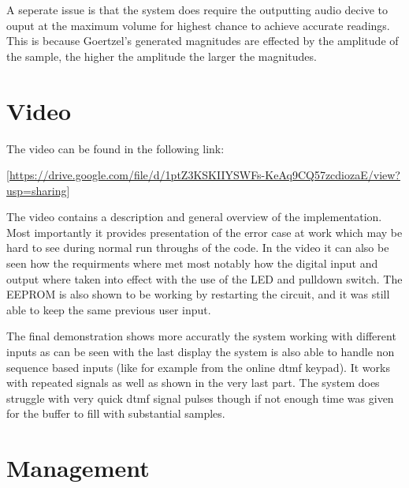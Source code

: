 \documentclass{cce2014-design}
\begin{document}
A seperate issue is that the system does require the outputting audio decive to 
ouput at the maximum volume for highest chance to achieve accurate readings. This is 
because Goertzel's generated magnitudes are effected by the amplitude of the sample, the 
higher the amplitude the larger the magnitudes.

\section{Video}
The video can be found in the following link:

[\url{https://drive.google.com/file/d/1ptZ3KSKIIYSWFs-KeAq9CQ57zcdiozaE/view?usp=sharing}]

The video contains a description and general overview of the implementation. Most
importantly it provides presentation of the error case at work which may be hard to
see during normal run throughs of the code. In the video it can also be seen how the
requirments where met most notably how the digital input and output where taken into
effect with the use of the LED and pulldown switch. The EEPROM is also shown to be 
working by restarting the circuit, and it was still able to keep the same previous 
user input.

The final demonstration shows more accuratly the system working with different inputs
as can be seen with the last display the system is also able to handle non sequence based
inputs (like for example from the online dtmf keypad). It works with repeated signals as 
well as shown in the very last part. The system does struggle with very quick dtmf signal
pulses though if not enough time was given for the buffer to fill with substantial samples.



\section{Management}
\end{document}
